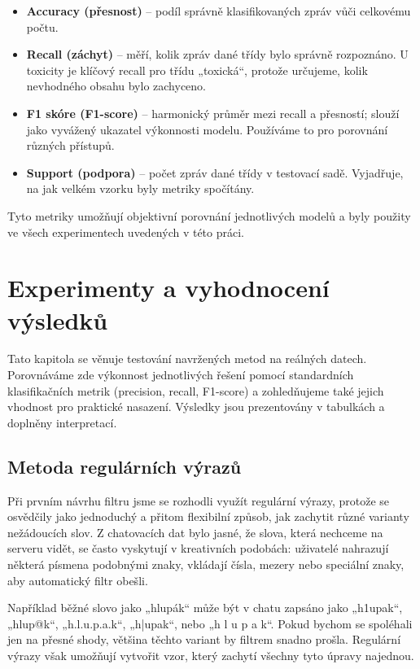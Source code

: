 \documentclass[FM,Proj]{tulthesis}
\begin{document}
\begin{itemize}
    \item \textbf{Accuracy (přesnost)} – podíl správně klasifikovaných zpráv vůči celkovému počtu.
    \item \textbf{Recall (záchyt)} – měří, kolik zpráv dané třídy bylo správně rozpoznáno. U toxicity je klíčový recall pro třídu „toxická“, protože určujeme, kolik nevhodného obsahu bylo zachyceno.
    \item \textbf{F1 skóre (F1-score)} – harmonický průměr mezi recall a přesností; slouží jako vyvážený ukazatel výkonnosti modelu. Používáme to pro porovnání různých přístupů.
    \item \textbf{Support (podpora)} – počet zpráv dané třídy v testovací sadě. Vyjadřuje, na jak velkém vzorku byly metriky spočítány.
\end{itemize}

Tyto metriky umožňují objektivní porovnání jednotlivých modelů a byly použity ve všech experimentech uvedených v této práci.

\chapter{Experimenty a vyhodnocení výsledků}
Tato kapitola se věnuje testování navržených metod na reálných datech. Porovnáváme zde výkonnost jednotlivých řešení pomocí standardních klasifikačních metrik (precision, recall, F1-score) a zohledňujeme také jejich vhodnost pro praktické nasazení. Výsledky jsou prezentovány v tabulkách a doplněny interpretací.

\section{ Metoda regulárních výrazů}\label{deklarace}
Při prvním návrhu filtru jsme se rozhodli využít regulární výrazy, protože se osvědčily jako jednoduchý a přitom flexibilní způsob, jak zachytit různé varianty nežádoucích slov. Z chatovacích dat bylo jasné, že slova, která nechceme na serveru vidět, se často vyskytují v kreativních podobách: uživatelé nahrazují některá písmena podobnými znaky, vkládají čísla, mezery nebo speciální znaky, aby automatický filtr obešli.

Například běžné slovo jako „hlupák“ může být v chatu zapsáno jako „h1upak“, „hlup@k“, „h.l.u.p.a.k“, „h|upak“, nebo „h l u p a k“. Pokud bychom se spoléhali jen na přesné shody, většina těchto variant by filtrem snadno prošla. Regulární výrazy však umožňují vytvořit vzor, který zachytí všechny tyto úpravy najednou.
\end{document}
